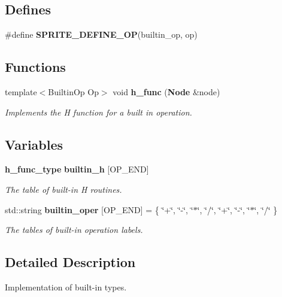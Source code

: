\subsection*{Defines}
\begin{CompactItemize}
\item 
\#define {\bf SPRITE\_\-DEFINE\_\-OP}(builtin\_\-op, op)
\end{CompactItemize}
\subsection*{Functions}
\begin{CompactItemize}
\item 
template$<$Builtin\-Op Op$>$ void {\bf h\_\-func} ({\bf Node} \&node)\label{namespacesprite_a44}

\begin{CompactList}\small\item\em Implements the H function for a built in operation. \item\end{CompactList}\end{CompactItemize}
\subsection*{Variables}
\begin{CompactItemize}
\item 
{\bf h\_\-func\_\-type} {\bf builtin\_\-h} [OP\_\-END]
\begin{CompactList}\small\item\em The table of built-in H routines. \item\end{CompactList}\item 
std::string {\bf builtin\_\-oper} [OP\_\-END] = \{ \char`\"{}+\char`\"{}, \char`\"{}-\char`\"{}, \char`\"{}$\ast$\char`\"{}, \char`\"{}/\char`\"{}, \char`\"{}+\char`\"{}, \char`\"{}-\char`\"{}, \char`\"{}$\ast$\char`\"{}, \char`\"{}/\char`\"{} \}\label{namespacesprite_a1}

\begin{CompactList}\small\item\em The tables of built-in operation labels. \item\end{CompactList}\end{CompactItemize}


\subsection{Detailed Description}
Implementation of built-in types. 



